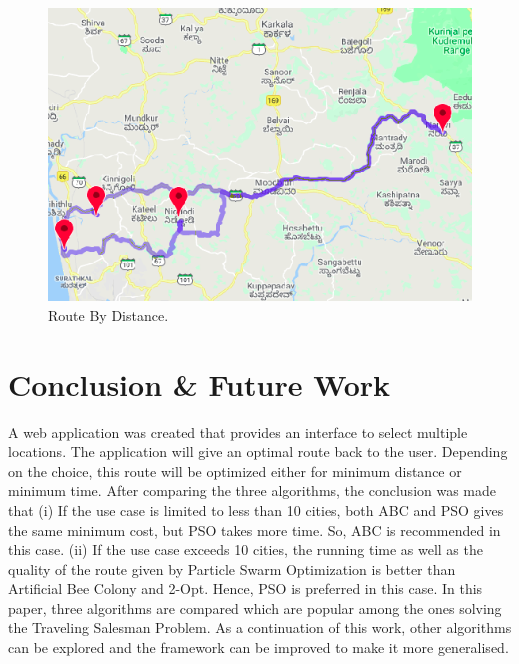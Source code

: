 \documentclass[conference]{IEEEtran}
\begin{document}
\begin{figure}[htbp]
\centerline{\includegraphics[width=\columnwidth]{time.png}}
\caption{Route By Distance.}
\label{fig6}
\end{figure}

\section {Conclusion \& Future Work}
A web application was created that provides an interface to select multiple locations. The application will give an optimal route back to the user. Depending on the choice, this route will be optimized either for minimum distance or minimum time. After comparing the three algorithms, the conclusion was made that (i) If the use case is limited to less than 10 cities, both ABC and PSO gives the same minimum cost, but PSO takes more time. So, ABC is recommended in this case. (ii) If the use case exceeds 10 cities, the running time as well as the quality of the route given by Particle Swarm Optimization is better than Artificial Bee Colony and 2-Opt. Hence, PSO is preferred in this case. In this paper, three algorithms are compared which are popular among the ones solving the Traveling Salesman Problem. As a continuation of this work, other algorithms can be explored and the framework can be improved to make it more generalised.
\end{document}
